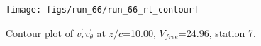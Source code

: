 \begin{figure}[H]
\centering
\texttt{[image: figs/run\_66/run\_66\_rt\_contour]}
\caption{Contour plot of $\overline{v_{r}^{\prime} v_{\theta}^{\prime}}$ at $z/c$=10.00, $V_{free}$=24.96, station 7.}
\label{fig:run_66_rt_contour}
\end{figure}


